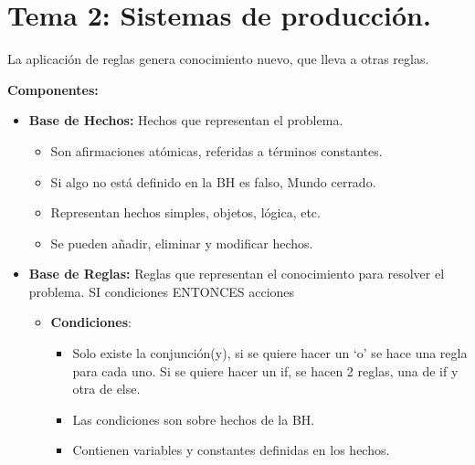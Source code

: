 \documentclass[12pt, twoside, openright]{report} %
\begin{document}





\chapter{Tema 2: Sistemas de producción.}


  La aplicación de reglas genera conocimiento nuevo, que lleva a otras
  reglas.

 
  \textbf{Componentes:}
  

  \begin{itemize}
  \item \textbf{Base de Hechos:} Hechos que representan el problema.
    

    \begin{itemize}
    \item Son afirmaciones atómicas, referidas a términos constantes.
      
    \item Si algo no está definido en la BH es falso, Mundo cerrado.
      
    \item Representan hechos simples, objetos, lógica, etc.
      
    \item Se pueden añadir, eliminar y modificar hechos.
      
    \end{itemize}
  \item \textbf{Base de Reglas:} Reglas que representan el conocimiento para
    resolver el problema. SI condiciones ENTONCES acciones
    

    \begin{itemize}
    \item \textbf{Condiciones}:
      

      \begin{itemize}
      \item Solo existe la conjunción(y), si se quiere hacer un `o' se hace
        una regla para cada uno. Si se quiere hacer un if, se hacen 2
        reglas, una de if y otra de else.
        
      \item Las condiciones son sobre hechos de la BH.
        
      \item Contienen variables y constantes definidas en los hechos.
        

\end{itemize}
\end{itemize}
\end{itemize}
\end{document}

